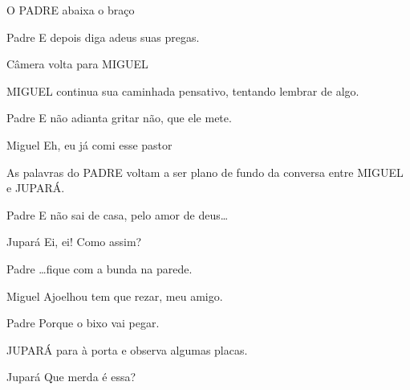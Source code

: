 \documentclass{screenplay}
\begin{document}
O PADRE abaixa o braço

\begin{dialogue}{Padre}
    E depois diga adeus suas pregas.
\end{dialogue}

Câmera volta para MIGUEL

MIGUEL continua sua caminhada pensativo, tentando lembrar de algo.

\begin{dialogue}{Padre}
    E não adianta gritar não, que ele mete.
\end{dialogue}

\begin{dialogue}{Miguel}
    Eh, eu já comi esse pastor
\end{dialogue}

As palavras do PADRE voltam a ser plano de fundo da conversa entre MIGUEL e JUPARÁ.

\begin{dialogue}{Padre}
    E não sai de casa, pelo amor de deus\dots
\end{dialogue}

\begin{dialogue}{Jupará}
    Ei, ei! Como assim?
\end{dialogue}

\begin{dialogue}{Padre}
    \dots fique com a bunda na parede.
\end{dialogue}

\begin{dialogue}{Miguel}
    Ajoelhou tem que rezar, meu amigo.
\end{dialogue}

\begin{dialogue}{Padre}
    Porque o bixo vai pegar.
\end{dialogue}

JUPARÁ para à porta e observa algumas placas.

\begin{dialogue}{Jupará}
    Que merda é essa?
\end{dialogue}


\fadeout
\theend
\end{document}
